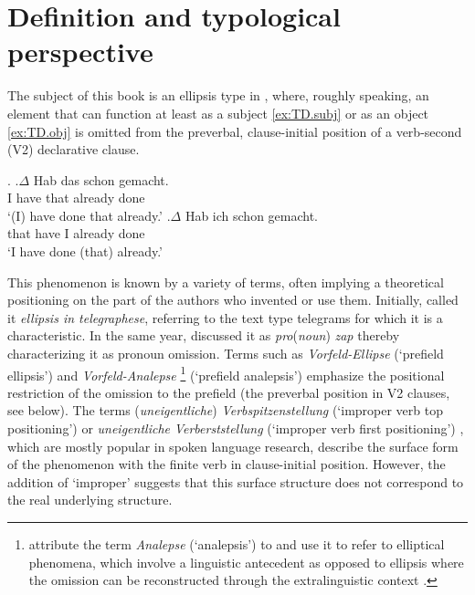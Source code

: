 \chapter{Definition and typological perspective}\label{ch:definition}

The subject of this book is an ellipsis type in , where, roughly speaking, an element that can function at least as a subject \ref{ex:TD.subj} or as an object \ref{ex:TD.obj} is omitted from the preverbal, clause-initial position of a verb-second (V2) declarative clause.

\ex.\label{ex:TD}
\ag.\label{ex:TD.subj}$\Delta$ Hab das schon gemacht.\\
I have that already done\\
`(I) have done that already.'
\bg.\label{ex:TD.obj}$\Delta$ Hab ich schon gemacht.\\
that have I already done\\
`I have done (that) already.'

This phenomenon is known by a variety of terms, often implying a theoretical positioning on the part of the authors who invented or use them.
Initially, \citet{reis1982} called it \textit{ellipsis in telegraphese}, referring to the text type telegrams for which it is a characteristic. 
In the same year, \citet{ross1982} discussed it as \textit{pro}(\textit{noun}) \textit{zap} \citep[see also][]{fries1988} thereby characterizing it as pronoun omission.
Terms such as \textit{Vorfeld-Ellipse} (`prefield ellipsis') \citep{reis2000, frick2017} and \textit{Vorfeld-Analepse}%
\footnote{\citet{zifonun.etal1997} attribute the term \textit{Analepse} (`analepsis') to \citet{blatz1896} and use it to refer to elliptical phenomena, which involve a linguistic antecedent  as opposed to ellipsis where the omission can be reconstructed through the extralinguistic context \citep[569]{zifonun.etal1997}.}
%
(`prefield analepsis') \citep{hoffmann1999} emphasize the positional restriction of the omission to the prefield (the preverbal position in V2 clauses, see below).
The terms (\textit{uneigentliche}) \textit{Verbspitzenstellung} (`improper verb top positioning') \citep{auer1993,sandig2000,guenthner2006,imo2013,ruppenhofer2018} or \textit{uneigentliche} \textit{Verberststellung} (`improper verb first positioning') \citep[§493--494]{duden2022}, which are mostly popular in spoken language research, describe the surface form of the phenomenon with the finite verb in clause-initial position.
However, the addition of `improper' suggests that this surface structure does not correspond to the real underlying structure.

